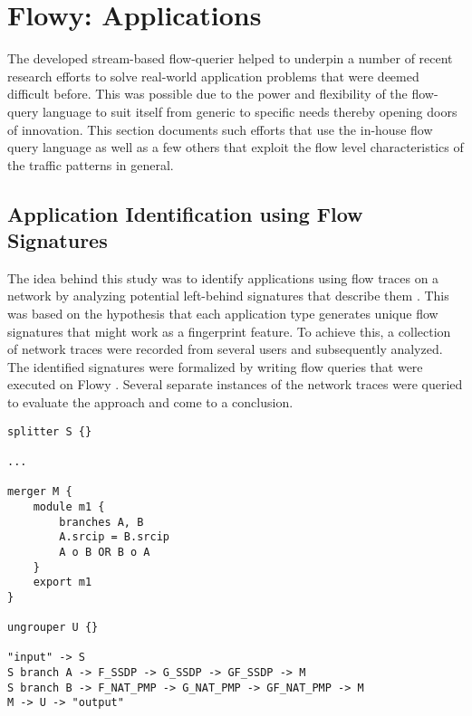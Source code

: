 \chapter{Flowy: Applications}\label{ch:flowy-applications}

The developed stream-based flow-querier helped to underpin a number of recent research efforts to solve real-world application problems that were deemed difficult before. This was possible due to the power and flexibility of the flow-query language to suit itself from generic to specific needs thereby opening doors of innovation. This section documents such efforts that use the in-house flow query language as well as a few others that exploit the flow level characteristics of the traffic patterns in general. 

\section{Application Identification using Flow 
Signatures}\label{sec:application-signatures}
The idea behind this study was to identify applications using flow traces on a network by analyzing potential left-behind signatures that describe them \cite{vperelman:2011}\cite{vperelman:thesis:2010}. This was based on the hypothesis that each application type generates unique flow signatures that might work as a fingerprint feature. To achieve this, a collection of network traces were recorded from several users and subsequently analyzed. The identified signatures were formalized by writing flow queries that were executed on Flowy \cite{kkanev:2010}. Several separate instances of the network traces were queried to evaluate the approach and come to a conclusion. 

\begin{lstlisting}
splitter S {}
	
...

merger M {
	module m1 {
		branches A, B
		A.srcip = B.srcip
		A o B OR B o A
	}
	export m1
}

ungrouper U {}
		
"input" -> S
S branch A -> F_SSDP -> G_SSDP -> GF_SSDP -> M
S branch B -> F_NAT_PMP -> G_NAT_PMP -> GF_NAT_PMP -> M
M -> U -> "output"
\end{lstlisting}


